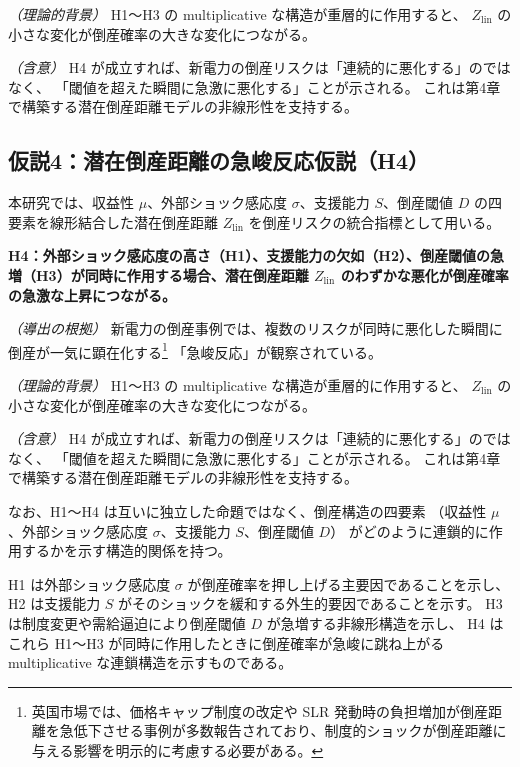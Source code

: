 \textit{（理論的背景）}
H1〜H3 の multiplicative な構造が重層的に作用すると、
$Z_{\text{lin}}$ の小さな変化が倒産確率の大きな変化につながる。

\textit{（含意）}
H4 が成立すれば、新電力の倒産リスクは「連続的に悪化する」のではなく、
「閾値を超えた瞬間に急激に悪化する」ことが示される。
これは第4章で構築する潜在倒産距離モデルの非線形性を支持する。


\bigskip

\subsection*{仮説4：潜在倒産距離の急峻反応仮説（H4）}

本研究では、収益性 $\mu$、外部ショック感応度 $\sigma$、支援能力 $S$、倒産閾値 $D$
の四要素を線形結合した潜在倒産距離 $Z_{\text{lin}}$ を倒産リスクの統合指標として用いる。

\textbf{H4：外部ショック感応度の高さ（H1）、支援能力の欠如（H2）、倒産閾値の急増（H3）が同時に作用する場合、潜在倒産距離 $Z_{\text{lin}}$ のわずかな悪化が倒産確率の急激な上昇につながる。}

\textit{（導出の根拠）}  
新電力の倒産事例では、複数のリスクが同時に悪化した瞬間に
倒産が一気に顕在化する\footnote{英国市場では、価格キャップ制度の改定や SLR 発動時の負担増加が倒産距離を急低下させる事例が多数報告されており、制度的ショックが倒産距離に与える影響を明示的に考慮する必要がある。}
「急峻反応」が観察されている。

\textit{（理論的背景）}  
H1〜H3 の multiplicative な構造が重層的に作用すると、
$Z_{\text{lin}}$ の小さな変化が倒産確率の大きな変化につながる。

\textit{（含意）}  
H4 が成立すれば、新電力の倒産リスクは「連続的に悪化する」のではなく、
「閾値を超えた瞬間に急激に悪化する」ことが示される。
これは第4章で構築する潜在倒産距離モデルの非線形性を支持する。

\vspace{1\baselineskip}

なお、H1〜H4 は互いに独立した命題ではなく、倒産構造の四要素
（収益性 $\mu$、外部ショック感応度 $\sigma$、支援能力 $S$、倒産閾値 $D$）
がどのように連鎖的に作用するかを示す構造的関係を持つ。

H1 は外部ショック感応度 $\sigma$ が倒産確率を押し上げる主要因であることを示し、
H2 は支援能力 $S$ がそのショックを緩和する外生的要因であることを示す。
H3 は制度変更や需給逼迫により倒産閾値 $D$ が急増する非線形構造を示し、
H4 はこれら H1〜H3 が同時に作用したときに倒産確率が急峻に跳ね上がる
multiplicative な連鎖構造を示すものである。

